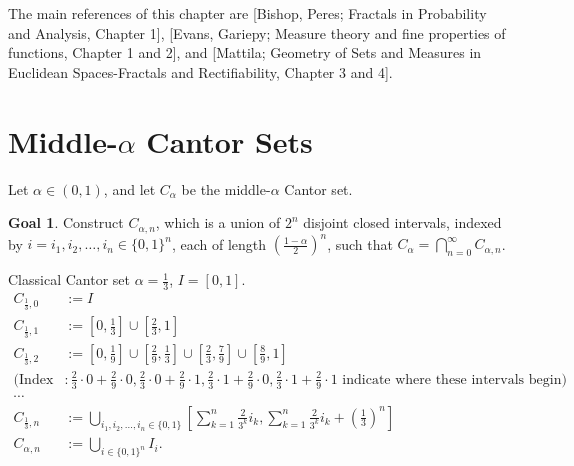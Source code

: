 \theoremstyle{definition}
\newtheorem*{goal}{Goal}

The main references of this chapter are [Bishop, Peres; Fractals in Probability and Analysis, Chapter 1], [Evans, Gariepy; Measure theory and fine properties of functions, Chapter 1 and 2], and [Mattila; Geometry of Sets and Measures in Euclidean Spaces-Fractals and Rectifiability, Chapter 3 and 4].

\section{Middle-$\alpha$ Cantor Sets}
    Let $\alpha \in (0,1)$, and let $C_\alpha$ be the middle-$\alpha$ Cantor set.
    \begin{goal}
        Construct $C_{\alpha,n}$, which is a union of $2^n$ disjoint closed intervals, indexed by $i=i_1,i_2, \ldots ,i_{n}\in \{0,1\}^{n}$, each of length $\left(\frac{1-\alpha}{2}\right)^n$, such that $C_\alpha = \bigcap_{n=0}^\infty C_{\alpha,n}$.
    \end{goal}
    \begin{example}
        Classical Cantor set $\alpha=\frac{1}{3}$, $I=[0,1]$.
        \begin{equation*}
          \begin{aligned}
          C_{\frac{1}{3},0}&:=I \\
          C_{\frac{1}{3},1}&:=\left[0, \frac{1}{3}\right] \cup\left[\frac{2}{3}, 1\right] \\
          C_{\frac{1}{3},2}&:=\left[0, \frac{1}{9}\right] \cup\left[\frac{2}{9}, \frac{1}{3}\right] \cup\left[\frac{2}{3}, \frac{7}{9}\right] \cup\left[\frac{8}{9}, 1\right] \\
          (\text{Index}&: \frac{2}{3}\cdot 0 + \frac{2}{9}\cdot 0, \frac{2}{3}\cdot 0 + \frac{2}{9}\cdot 1, \frac{2}{3}\cdot 1 + \frac{2}{9}\cdot 0, \frac{2}{3}\cdot 1 + \frac{2}{9}\cdot 1 \text{ indicate where these intervals begin}) \\
          \cdots \\
          C_{\frac{1}{3},n}&:=\bigcup_{i_1,i_2,\ldots,i_n \in \{0,1\}} \left[\sum_{k=1}^n \frac{2}{3^k} i_k, \sum_{k=1}^n \frac{2}{3^k} i_k + \left(\frac{1}{3}\right)^n\right] \\
          C_{\alpha,n}&:= \bigcup_{i \in \{0,1\}^{n}} I_{i}.
          \end{aligned}
        \end{equation*}
    \end{example}
